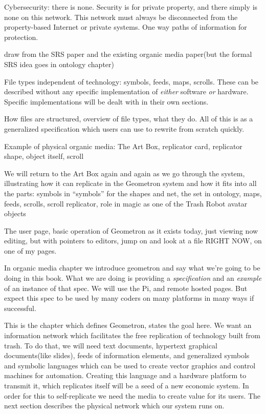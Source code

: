 Cybersecurity: there is none. Security is for private property, and
there simply is none on this network. This network must always be
disconnected from the property-based Internet or private systems. One
way paths of information for protection.

draw from the SRS paper and the existing organic media paper(but the
formal SRS idea goes in ontology chapter)

File types independent of technology: symbols, feeds, maps, scrolls.
These can be described without any specific implementation of
\emph{either} software \emph{or} hardware. Specific implementations will
be dealt with in their own sections.

How files are structured, overview of file types, what they do. All of
this is as a generalized specification which users can use to rewrite
from scratch quickly.

Example of physical organic media: The Art Box, replicator card,
replicator shape, object itself, scroll

We will return to the Art Box again and again as we go through the
system, illustrating how it can replicate in the Geometron system and
how it fits into all the parts: symbols in ``symbols'' for the shapes
and net, the set in ontology, maps, feeds, scrolls, scroll replicator,
role in magic as one of the Trash Robot avatar objects

The user page, basic operation of Geometron as it exists today, just
viewing now editing, but with pointers to editors, jump on and look at a
file RIGHT NOW, on one of my pages.

In organic media chapter we introduce geometron and say what we're going
to be doing in this book. What we are doing is providing a
\emph{specification} and an \emph{example} of an instance of that spec.
We will use the Pi, and remote hosted pages. But expect this spec to be
used by many coders on many platforms in many ways if successful.

This is the chapter which defines Geometron, states the goal here.  We want an information network which facilitates the free replication of technology built from trash.  To do that, we will need text documents, hypertext graphical documents(like slides), feeds of information elements, and generalized symbols and symbolic languages which can be used to create vector graphics and control machines for automation.  Creating this language and a hardware platform to transmit it, which replicates itself will be a seed of a new economic system.  In order for this to self-replicate we need the media to create value for its users.  The next section describes the physical network which our system runs on.   

